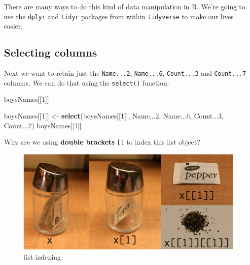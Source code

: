 \documentclass[]{book}
\newenvironment{Shaded}{\begin{snugshade}}{\end{snugshade}}
\newcommand{\KeywordTok}[1]{\textcolor[rgb]{0.13,0.29,0.53}{\textbf{#1}}}
\newcommand{\DecValTok}[1]{\textcolor[rgb]{0.00,0.00,0.81}{#1}}
\newcommand{\StringTok}[1]{\textcolor[rgb]{0.31,0.60,0.02}{#1}}
\newcommand{\NormalTok}[1]{#1}
\begin{document}
There are many ways to do this kind of data manipulation in R. We're
going to use the \texttt{dplyr} and \texttt{tidyr} packages from within
\texttt{tidyverse} to make our lives easier.

\subsection{Selecting columns}\label{selecting-columns}

Next we want to retain just the \texttt{Name...2}, \texttt{Name...6},
\texttt{Count...3} and \texttt{Count...7} columns. We can do that using
the \texttt{select()} function:

\begin{Shaded}
\begin{Highlighting}[]
\NormalTok{boysNames[[}\DecValTok{1}\NormalTok{]]}

\NormalTok{boysNames[[}\DecValTok{1}\NormalTok{]] <-}\StringTok{ }\KeywordTok{select}\NormalTok{(boysNames[[}\DecValTok{1}\NormalTok{]], Name...}\DecValTok{2}\NormalTok{, Name...}\DecValTok{6}\NormalTok{, Count...}\DecValTok{3}\NormalTok{, Count...}\DecValTok{7}\NormalTok{)}
\NormalTok{boysNames[[}\DecValTok{1}\NormalTok{]]}
\end{Highlighting}
\end{Shaded}

Why are we using \textbf{double brackets} \texttt{{[}{[}} to index this
list object?

\begin{figure}
\centering
\includegraphics{R/RDataWrangling/images/indexing_lists.png}
\caption{list indexing}
\end{figure}
\end{document}
